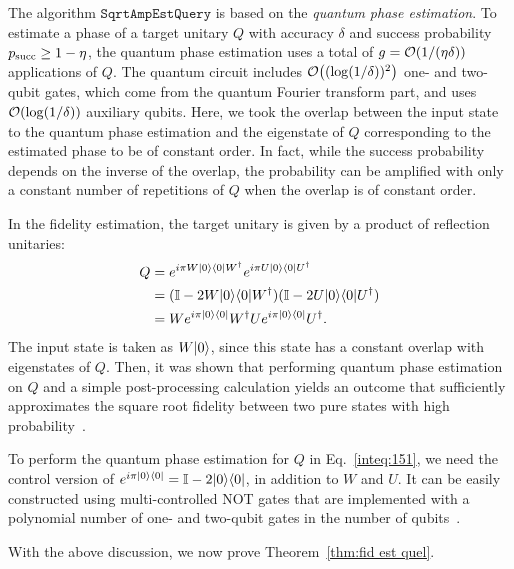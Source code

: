 The algorithm $\mathtt{SqrtAmpEstQuery}$ is based on the \emph{quantum phase estimation}.
To estimate a phase of a target unitary $Q$ with accuracy $\delta$ and success probability $p_{\rm succ} \geq 1 - \eta$, the quantum phase estimation uses a total of $g = {\mathcal{O}}(1/(\eta\delta))$ applications of $Q$. The quantum circuit includes ${\mathcal{O}}\big((\log(1/\delta))^2\big)$ one- and two-qubit gates, which come from the quantum Fourier transform part, and uses ${\mathcal{O}}(\log(1/\delta))$ auxiliary qubits.
Here, we took the overlap between the input state to the quantum phase estimation and the eigenstate of $Q$ corresponding to the estimated phase to be of constant order. In fact, while the success probability depends on the inverse of the overlap, the probability can be amplified with only a constant number of repetitions of $Q$ when the overlap is of constant order. 


In the fidelity estimation, the target unitary is given by a product of reflection unitaries: 
\begin{align}
    Q&= e^{i\pi W|0\rangle\langle0|W^\dag}e^{i\pi U|0\rangle\langle0|U^\dag} \\
    &= (\mathbb{I} - 2W|0\rangle\langle0|W^\dag)(\mathbb{I} - 2U|0\rangle\langle0|U^\dag)  \\
    \label{inteq:151}
    &= We^{i\pi|0\rangle\langle0|}W^\dag U e^{i\pi|0\rangle\langle0|}U^\dag.
\end{align}
The input state is taken as $W|0\rangle$, since this state has a constant overlap with eigenstates of $Q$.
Then, it was shown that performing quantum phase estimation on $Q$ and a simple post-processing calculation yields an outcome that sufficiently approximates the square root fidelity between two pure states with high probability~\cite{Wang2024OptimalFidelityPure}.

To perform the quantum phase estimation for $Q$ in Eq.~\eqref{inteq:151}, we need the control version of $e^{i\pi|0\rangle\langle0|} = \mathbb{I} - 2|0\rangle\langle0|$, in addition to $W$ and $U$. 
It can be easily constructed using multi-controlled NOT gates that are implemented with a polynomial number of one- and two-qubit gates in the number of qubits~\cite{nielsen2010quantum, saeedi2013NoAncilla, yoder2014fixed}.






With the above discussion, we now prove Theorem~\ref{thm:fid est quel}.

